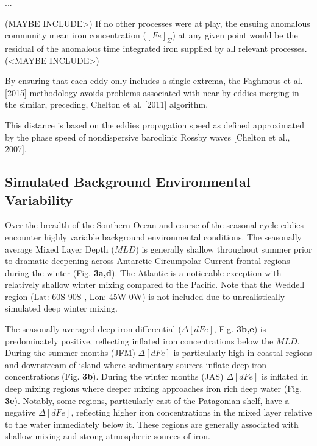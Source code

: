...

 (MAYBE INCLUDE>) If no other processes were at play, the ensuing anomalous community mean iron concentration ($[Fe]_\Sigma$) at any given point would be the residual of the anomalous time integrated iron supplied by all relevant processes. (<MAYBE INCLUDE>) 

 By ensuring that each eddy only includes a single extrema, the Faghmous et al. [2015] methodology avoids problems associated with near-by eddies merging in the similar, preceding, Chelton et al. [2011] algorithm.
 
 This distance is based on the eddies propagation speed as defined approximated by the phase speed of nondispersive baroclinic Rossby waves [Chelton et al., 2007].
 
 
 
 
 

\subsection{Simulated Background Environmental Variability}

Over the breadth of the Southern Ocean and course of the seasonal cycle eddies encounter highly variable background environmental conditions. The seasonally average Mixed Layer Depth ($MLD$) is generally shallow throughout summer prior to dramatic deepening across Antarctic Circumpolar Current frontal regions during the winter (Fig. \textbf{3a,d}). The Atlantic is a noticeable exception with relatively shallow winter mixing compared to the Pacific. Note that the Weddell region (Lat: 60\deg S-90\deg S , Lon: 45\deg W-0\deg W) is not included due to unrealistically simulated deep winter mixing.

The seasonally averaged deep iron differential ($\Delta[dFe]$, Fig. \textbf{3b,e}) is predominately positive, reflecting inflated iron concentrations below the $MLD$. During the summer months (JFM) $\Delta[dFe]$ is particularly high in coastal regions and downstream of island where sedimentary sources inflate deep iron concentrations (Fig. \textbf{3b}). During the winter months (JAS) $\Delta[dFe]$ is inflated in deep mixing regions where deeper mixing approaches iron rich deep water (Fig. \textbf{3e}). Notably, some regions, particularly east of the Patagonian shelf, have a negative $\Delta[dFe]$, reflecting higher iron concentrations in the mixed layer relative to the water immediately below it. These regions are generally associated with shallow mixing and strong atmospheric sources of iron.  


